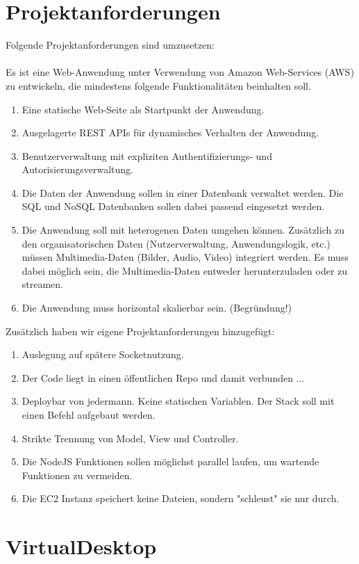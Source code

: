 \documentclass[a4paper, 12pt]{scrreprt}
\begin{document}
\section{Projektanforderungen}
Folgende Projektanforderungen sind umzusetzen:
\\ \\
Es ist eine Web-Anwendung unter Verwendung von Amazon Web-Services (AWS) zu
entwickeln, die mindestens folgende Funktionalitäten beinhalten soll.
\begin{enumerate}
\item Eine statische Web-Seite als Startpunkt der Anwendung.
\item Ausgelagerte REST APIs für dynamisches Verhalten der Anwendung.
\item Benutzerverwaltung mit expliziten Authentifizierungs- und Autorisierungsverwaltung.
\item Die Daten der Anwendung sollen in einer Datenbank verwaltet werden. Die SQL und NoSQL Datenbanken sollen dabei passend eingesetzt werden.
\item Die Anwendung soll mit heterogenen Daten umgehen können. Zusätzlich zu den
organisatorischen Daten (Nutzerverwaltung, Anwendungslogik, etc.) müssen
Multimedia-Daten (Bilder, Audio, Video) integriert werden. Es muss dabei möglich
sein, die Multimedia-Daten entweder herunterzuladen oder zu streamen.
\item Die Anwendung muss horizontal skalierbar sein. (Begründung!)
\end{enumerate}
Zusätzlich haben wir eigene Projektanforderungen hinzugefügt:
\begin{enumerate}
\item Auslegung auf spätere Socketnutzung.
\item Der Code liegt in einen öffentlichen Repo und damit verbunden ...
\item Deploybar von jedermann. Keine statischen Variablen. Der Stack soll mit einen Befehl aufgebaut werden.
\item Strikte Trennung von Model, View und Controller. 
\item Die NodeJS Funktionen sollen möglichst parallel laufen, um wartende Funktionen zu vermeiden.
\item Die EC2 Instanz speichert keine Dateien, sondern "schleust" sie nur durch.
\end{enumerate}

\section{VirtualDesktop}
\end{document}

